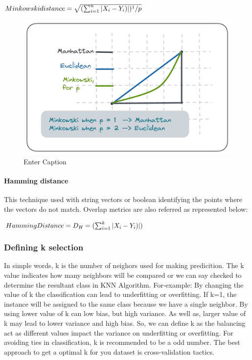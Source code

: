 \documentclass[conference]{IEEEtran}
\begin{document}
\begin{math}
 Minkowski distance =\sqrt{(\sum_{i=1}^{n} |X_{i} - Y_{i})|)^1/p}
 \newline
\end{math}

\begin{figure}
    \centering
    \includegraphics[width=0.8\linewidth]{b.jpg}
    \caption{Enter Caption}
    \label{fig:enter-label}
\end{figure}

\paragraph{Hamming distance}
This technique used with string vectors or boolean identifying the points where the vectors do not match. Overlap metrics are also referred as represented below:

\begin{math}
 Hamming Distance = D_{H}=(\sum_{i=1}^{k} |X_{i} - Y_{i})|)
 \newline
\end{math}



\subsubsection{Defining k selection}
In simple words, k is the number of neighors used for making predicition. The k value indicates how many neighbors will be compared or we can say checked to determine the resultant class in KNN Algorithm. For-example: By changing the value of k the classification can lead to underfitting or overfitting. If k=1, the instance will be assigned to the same class because we have a single neighbor. By using lower value of k can low bias, but high variance. As well as, larger value of k may lead to lower variance and high bias. So, we can define k as the balancing act as different values impact the variance on underfitting or overfitting. For avoiding ties in classification, k is recommended to be a odd number. The best approach to get a optimal k for you dataset is cross-validation tactics.  
\end{document}
